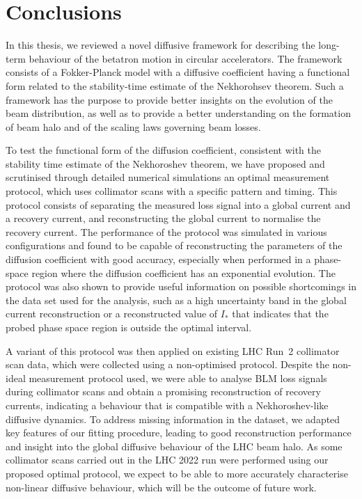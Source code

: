 \chapter*{Conclusions}

In this thesis, we reviewed a novel diffusive framework for describing the long-term behaviour of the betatron motion in circular accelerators. The framework consists of a Fokker-Planck model with a diffusive coefficient having a functional form related to the stability-time estimate of the Nekhorohsev theorem. Such a framework has the purpose to provide better insights on the evolution of the beam distribution, as well as to provide a better understanding on the formation of beam halo and of the scaling laws governing beam losses.

To test the functional form of the diffusion coefficient, consistent with the stability time estimate of the Nekhoroshev theorem, we have proposed and scrutinised through detailed numerical simulations an optimal measurement protocol, which uses collimator scans with a specific pattern and timing. This protocol consists of separating the measured loss signal into a global current and a recovery current, and reconstructing the global current to normalise the recovery current. The performance of the protocol was simulated in various configurations and found to be capable of reconstructing the parameters of the diffusion coefficient with good accuracy, especially when performed in a phase-space region where the diffusion coefficient has an exponential evolution. The protocol was also shown to provide useful information on possible shortcomings in the data set used for the analysis, such as a high uncertainty band in the global current reconstruction or a reconstructed value of $I_\ast$ that indicates that the probed phase space region is outside the optimal interval.

A variant of this protocol was then applied on existing LHC Run~2 collimator scan data, which were collected using a non-optimised protocol. Despite the non-ideal measurement protocol used, we were able to analyse BLM loss signals during collimator scans and obtain a promising reconstruction of recovery currents, indicating a behaviour that is compatible with a Nekhoroshev-like diffusive dynamics. To address missing information in the dataset, we adapted key features of our fitting procedure, leading to good reconstruction performance and insight into the global diffusive behaviour of the LHC beam halo. As some collimator scans carried out in the LHC 2022 run were performed using our proposed optimal protocol, we expect to be able to more accurately characterise non-linear diffusive behaviour, which will be the outcome of future work.

